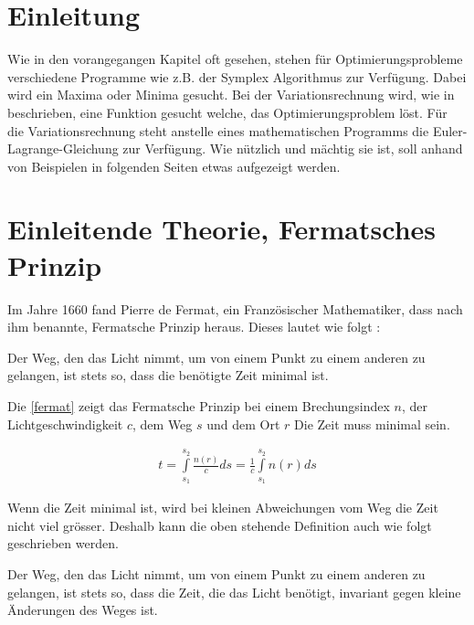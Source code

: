 \section{Einleitung}
Wie in den vorangegangen Kapitel oft gesehen, stehen für Optimierungsprobleme verschiedene Programme wie z.B. der Symplex Algorithmus zur Verfügung. Dabei wird ein Maxima oder Minima gesucht. Bei der Variationsrechnung wird, wie in  beschrieben, eine Funktion gesucht welche, das Optimierungsproblem löst. Für die Variationsrechnung steht anstelle eines mathematischen Programms die Euler-Lagrange-Gleichung zur Verfügung. Wie nützlich und mächtig sie ist, soll anhand von Beispielen in folgenden Seiten etwas aufgezeigt werden.

\section{Einleitende Theorie, Fermatsches Prinzip}

Im Jahre 1660 fand Pierre de Fermat, ein Französischer Mathematiker, dass  nach ihm benannte, Fermatsche Prinzip heraus. 
Dieses lautet wie folgt \cite{DefinitionFermat}:

\begin{definition}
	Der Weg, den das Licht nimmt, 
	um von einem Punkt zu einem anderen zu gelangen, 
	ist stets so, dass die benötigte Zeit minimal ist.
\end{definition}

Die \eqref{fermat} zeigt das Fermatsche Prinzip bei einem Brechungsindex $n$, 
der Lichtgeschwindigkeit $c$, dem Weg $s$ und dem Ort $r$ Die Zeit muss minimal sein.

\begin{align}
	t= \int\limits_{s_1}^{s_2} \frac{n(r)}{c} ds = \frac{1}{c} \int\limits_{s_1}^{s_2} n(r) ds
	\label{fermat}
\end{align}


Wenn die Zeit minimal ist, wird bei kleinen Abweichungen vom Weg die Zeit nicht viel grösser. 
Deshalb kann die oben stehende Definition auch wie folgt geschrieben werden\cite{Definition}.

\begin{definition}
Der Weg, den das Licht nimmt,  um von einem Punkt zu einem anderen zu gelangen, 
ist stets so, dass die Zeit, die das Licht benötigt, invariant gegen kleine Änderungen des Weges ist.
\end{definition}

